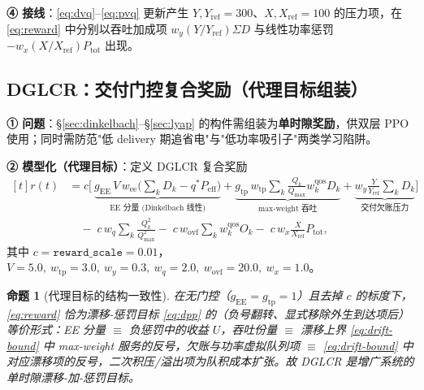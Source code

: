 \documentclass[UTF8,11pt,a4paper]{ctexart}
\theoremstyle{plain}
\newtheorem{proposition}[theorem]{命题}
\theoremstyle{definition}
\theoremstyle{remark}
\begin{document}
\textbf{④ 接线}：\eqref{eq:dvq}--\eqref{eq:pvq} 更新产生 $Y,Y_{\mathrm{ref}}=300$、$X,X_{\mathrm{ref}}=100$ 的压力项，在 \eqref{eq:reward} 中分别以吞吐加成项 $w_y(Y/Y_{\mathrm{ref}})\Sigma D$ 与线性功率惩罚 $-w_x(X/X_{\mathrm{ref}})P_{\mathrm{tot}}$ 出现。

\subsection{DGLCR：交付门控复合奖励（代理目标组装）} \label{sec:dglcr}

\textbf{① 问题}：\S\ref{sec:dinkelbach}--\S\ref{sec:lyap} 的构件需组装为\textbf{单时隙奖励}，供双层 PPO 使用；同时需防范"低 delivery 期追省电"与"低功率吸引子"两类学习陷阱。

\textbf{② 模型化（代理目标）}：定义 DGLCR 复合奖励
\begin{equation}
  \begin{aligned}[t]
  r(t) &= c\Big[\ \underbrace{g_{\mathrm{EE}}\,V\,w_{\mathrm{ee}}\big({\textstyle\sum_k}D_k - q^*P_{\mathrm{eff}}\big)}_{\text{EE 分量 (Dinkelbach 线性)}}
    + \underbrace{g_{\mathrm{tp}}\,w_{\mathrm{tp}}\sum_k \tfrac{Q_k}{Q_{\max}}w_k^{\mathrm{qos}}D_k}_{\text{max-weight 吞吐}}
    + \underbrace{w_y\tfrac{Y}{Y_{\mathrm{ref}}}\sum_k D_k}_{\text{交付欠账压力}}\Big] \\[-2pt]
  &\quad - \; c\, w_q\sum_k \frac{Q_k^2}{Q_{\max}^2} - \; c\,w_{\mathrm{ovf}}\sum_k w_k^{\mathrm{qos}}O_k - \; c\, w_x\frac{X}{X_{\mathrm{ref}}}P_{\mathrm{tot}},
  \end{aligned}
  \label{eq:reward}
\end{equation}
其中 $c=\texttt{reward\_scale}=0.01$，$V=5.0,\ w_{\mathrm{tp}}=3.0,\ w_y=0.3,\ w_q=2.0,\ w_{\mathrm{ovf}}=20.0,\ w_x=1.0$。

\begin{proposition}[代理目标的结构一致性] \label{prop:surr}
在无门控（$g_{\mathrm{EE}}=g_{\mathrm{tp}}=1$）且去掉 $c$ 的标度下，\eqref{eq:reward} 恰为漂移-惩罚目标 \eqref{eq:dpp} 的（负号翻转、显式移除外生到达项后）等价形式：EE 分量 $\equiv$ 负惩罚中的收益 $U$，吞吐份量 $\equiv$ 漂移上界 \eqref{eq:drift-bound} 中 max-weight 服务的反号，欠账与功率虚拟队列项 $\equiv$ \eqref{eq:drift-bound} 中对应漂移项的反号，二次积压/溢出项为队积成本扩张。故 DGLCR 是\emph{增广系统的单时隙漂移-加-惩罚目标}。
\end{proposition}
\end{document}
